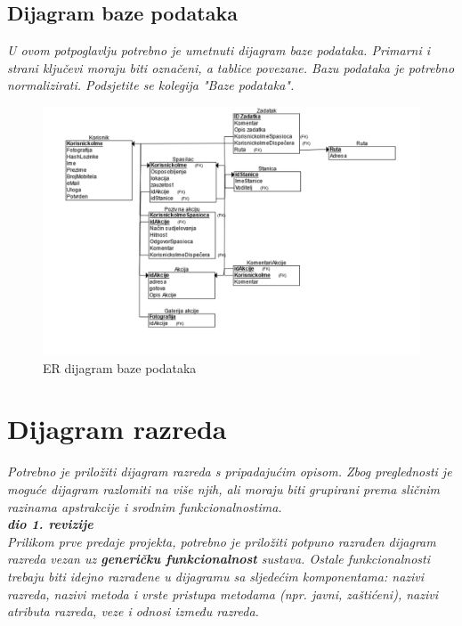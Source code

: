 				
			
			\subsection{Dijagram baze podataka}
				\textit{ U ovom potpoglavlju potrebno je umetnuti dijagram baze podataka. Primarni i strani ključevi moraju biti označeni, a tablice povezane. Bazu podataka je potrebno normalizirati. Podsjetite se kolegija "Baze podataka".}

				\begin{figure}[H]
					\includegraphics[scale=0.4]{slike/ModelBazePodataka.png} %
					\centering
					\caption{ER dijagram baze podataka}
					\label{fig:baza podataka}
				\end{figure}
			
			\eject
			
			
		\section{Dijagram razreda}
		
			\textit{Potrebno je priložiti dijagram razreda s pripadajućim opisom. Zbog preglednosti je moguće dijagram razlomiti na više njih, ali moraju biti grupirani prema sličnim razinama apstrakcije i srodnim funkcionalnostima.}\\
			
			\textbf{\textit{dio 1. revizije}}\\
		
			\textit{Prilikom prve predaje projekta, potrebno je priložiti potpuno razrađen dijagram razreda vezan uz \textbf{generičku funkcionalnost} sustava. Ostale funkcionalnosti trebaju biti idejno razrađene u dijagramu sa sljedećim komponentama: nazivi razreda, nazivi metoda i vrste pristupa metodama (npr. javni, zaštićeni), nazivi atributa razreda, veze i odnosi između razreda.}\\
			
